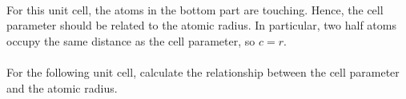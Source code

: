 \documentclass[main.tex]{subfiles}
\begin{document}
\begin{description}
\begin{example}
\begin{center}
{\begin{tikzpicture}
\end{tikzpicture}
}
\end{center}

\\
For this unit cell, the atoms in the bottom part are touching. Hence, the cell parameter should be related to the atomic radius. In particular, two half atoms occupy the same distance as the cell parameter, so  $c=r$.
\\
\faDiamond\ \\
For the following unit cell, calculate the relationship between the cell parameter and the atomic radius. 
\begin{center}
\scalebox{0.2}{
\begin{tikzpicture}
%
%
%

\end{tikzpicture}}
\end{center}
\end{example}
\end{description}
\end{document}
